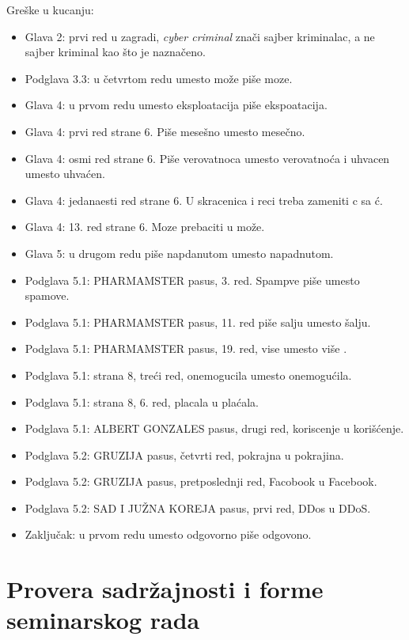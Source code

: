 \documentclass[a4paper]{report}
\begin{document}
Greške u kucanju:
\begin{itemize}
\item Glava 2: prvi red u zagradi, \textit{cyber criminal} znači sajber kriminalac, a ne sajber kriminal kao što je naznačeno.
\item Podglava 3.3: u četvrtom redu umesto može piše moze.
\item Glava 4: u prvom redu umesto eksploatacija piše ekspoatacija.
\item Glava 4: prvi red strane 6. Piše mesešno umesto mesečno.
\item Glava 4: osmi red strane 6. Piše verovatnoca umesto verovatnoća i uhvacen umesto uhvaćen.
\item Glava 4: jedanaesti red strane 6. U skracenica i reci treba zameniti c sa ć.
\item Glava 4: 13. red strane 6. Moze prebaciti u može.
\item Glava 5: u drugom redu piše napdanutom umesto napadnutom.
\item Podglava 5.1: PHARMAMSTER pasus, 3. red. Spampve piše umesto spamove.
\item Podglava 5.1: PHARMAMSTER pasus, 11. red piše salju umesto šalju.
\item Podglava 5.1: PHARMAMSTER pasus, 19. red, vise umesto više .
\item Podglava 5.1: strana 8, treći red, onemogucila umesto onemogućila.
\item Podglava 5.1: strana 8, 6. red, placala u plaćala.
\item Podglava 5.1: ALBERT GONZALES pasus, drugi red, koriscenje u korišćenje.
\item Podglava 5.2: GRUZIJA pasus, četvrti red, pokrajna u pokrajina.
\item Podglava 5.2: GRUZIJA pasus, pretposlednji red, Facobook u Facebook.
\item Podglava 5.2: SAD I JUŽNA KOREJA pasus, prvi red, DDos u DDoS.
\item Zaključak: u prvom redu umesto odgovorno piše odgovono.
\end{itemize}


\section{Provera sadržajnosti i forme seminarskog rada}
\end{document}
